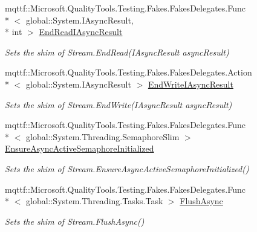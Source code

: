 \begin{DoxyCompactItemize}
mqttf\-::\-Microsoft.\-Quality\-Tools.\-Testing.\-Fakes.\-Fakes\-Delegates.\-Func\\*
$<$ global\-::\-System.\-I\-Async\-Result, \\*
int $>$ \hyperlink{class_system_1_1_i_o_1_1_fakes_1_1_shim_stream_a0232d3ef63ad7391a7a9b953a2891c51}{End\-Read\-I\-Async\-Result}
\begin{DoxyCompactList}\small\item\em Sets the shim of Stream.\-End\-Read(\-I\-Async\-Result async\-Result)\end{DoxyCompactList}\item 
mqttf\-::\-Microsoft.\-Quality\-Tools.\-Testing.\-Fakes.\-Fakes\-Delegates.\-Action\\*
$<$ global\-::\-System.\-I\-Async\-Result $>$ \hyperlink{class_system_1_1_i_o_1_1_fakes_1_1_shim_stream_a8683128e851b423cdb82192409fcb9de}{End\-Write\-I\-Async\-Result}
\begin{DoxyCompactList}\small\item\em Sets the shim of Stream.\-End\-Write(\-I\-Async\-Result async\-Result)\end{DoxyCompactList}\item 
mqttf\-::\-Microsoft.\-Quality\-Tools.\-Testing.\-Fakes.\-Fakes\-Delegates.\-Func\\*
$<$ global\-::\-System.\-Threading.\-Semaphore\-Slim $>$ \hyperlink{class_system_1_1_i_o_1_1_fakes_1_1_shim_stream_a1af2688b810ed882fc03f3539547689a}{Ensure\-Async\-Active\-Semaphore\-Initialized}
\begin{DoxyCompactList}\small\item\em Sets the shim of Stream.\-Ensure\-Async\-Active\-Semaphore\-Initialized()\end{DoxyCompactList}\item 
mqttf\-::\-Microsoft.\-Quality\-Tools.\-Testing.\-Fakes.\-Fakes\-Delegates.\-Func\\*
$<$ global\-::\-System.\-Threading.\-Tasks.\-Task $>$ \hyperlink{class_system_1_1_i_o_1_1_fakes_1_1_shim_stream_a15f7a3177989baa92ad180100bf19b6e}{Flush\-Async}
\begin{DoxyCompactList}\small\item\em Sets the shim of Stream.\-Flush\-Async()\end{DoxyCompactList}\item 

\end{DoxyCompactItemize}
